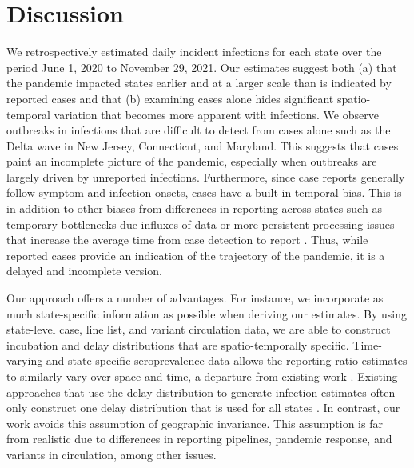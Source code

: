 \section{Discussion}

We retrospectively estimated daily incident infections for each \US state over
the period June 1, 2020 to November 29, 2021. Our  estimates suggest both (a)
that the pandemic impacted states earlier and at a larger scale than is
indicated by reported cases and that (b) examining cases alone hides significant
spatio-temporal variation that becomes more apparent with infections. We observe
outbreaks in infections that are difficult to detect from cases alone such as
the Delta wave in New Jersey, Connecticut, and Maryland. This suggests that
cases paint an incomplete picture of the pandemic, especially when outbreaks are
largely driven by unreported infections. Furthermore, since case reports
generally follow symptom and infection onsets, cases have a built-in temporal
bias. This is in addition to other biases from differences in reporting across
states such as temporary bottlenecks due influxes of data or more persistent
processing issues that increase the average time from case detection to report
\citep{wash2020dash, dunkel2020covid19}. Thus, while reported cases provide an
indication of the trajectory of the pandemic, it is a delayed and incomplete
version.

Our approach offers a number of advantages. For instance, we incorporate as much
state-specific information as possible when deriving our estimates. By using
state-level case, line list, and variant circulation data, we are able to
construct incubation and delay distributions that are spatio-temporally specific.
Time-varying and state-specific seroprevalence data allows the reporting ratio
estimates to similarly vary over space and time, a departure from existing work
\citep{unwin2020state, uga2020covid19}. Existing approaches that use the delay
distribution to generate infection estimates often only construct one delay
distribution that is used for all states \citep{chitwood2022reconstructing,
jahja2022real}. In contrast, our work avoids this assumption of geographic
invariance. This assumption is far from realistic due to
differences in reporting pipelines, pandemic response, and variants in
circulation, among other issues. 

